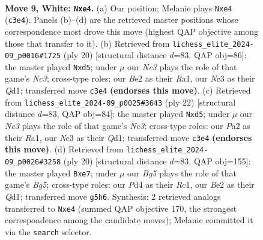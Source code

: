 \documentclass[11pt]{article}
\begin{document}
\clearpage

\begin{figure}[p]\centering
\begin{subfigure}{0.46\textwidth}\centering
\resizebox{\linewidth}{!}{%
\newchessgame
\chessboard[
  setfen={r1bqk2r/pp1nbppp/2p5/3p2B1/3Pn3/2N1P3/PP2BPPP/R2QK1NR w KQkq - 4 9},
  showmover=false,
  pgfstyle=straightmove, color=movearrow, markmove={c3-e4}
]}
\caption{}
\end{subfigure}\hfill
\begin{subfigure}{0.46\textwidth}\centering
\resizebox{\linewidth}{!}{%
\newchessgame
\chessboard[
  setfen={rn1qkb1r/1p3pp1/p3b2p/3np3/6P1/1NN1B3/PPP2P1P/R2QKBR1 w Qkq - 0 11},
  showmover=false,
  pgfstyle=straightmove, color=movearrow, markmove={c3-d5}
]}
\caption{}
\end{subfigure}
\\[4pt]
\begin{subfigure}{0.46\textwidth}\centering
\resizebox{\linewidth}{!}{%
\newchessgame
\chessboard[
  setfen={r2qkb1r/1p3pp1/p1n1b3/3np2p/8/2N1BN1P/PPP2PP1/R2QKB1R w KQkq - 0 12},
  showmover=false,
  pgfstyle=straightmove, color=movearrow, markmove={c3-d5}
]}
\caption{}
\end{subfigure}\hfill
\begin{subfigure}{0.46\textwidth}\centering
\resizebox{\linewidth}{!}{%
\newchessgame
\chessboard[
  setfen={r1bqr1k1/pp1nbppp/2p5/3p2B1/3Pn3/2NBPN2/PP3PPP/2RQ1RK1 w - - 4 11},
  showmover=false,
  pgfstyle=straightmove, color=movearrow, markmove={g5-e7}
]}
\caption{}
\end{subfigure}
\caption{\textbf{Move 9, White: \texttt{Nxe4}.} (a) Our position; Melanie plays \texttt{Nxe4} (\texttt{c3e4}). Panels (b)--(d) are the retrieved master positions whose correspondence most drove this move (highest QAP objective among those that transfer to it). (b) Retrieved from \texttt{lichess\_elite\_2024-09\_p0016\#1725} (ply 20) [structural distance $d$=83, QAP obj=86]: the master played \texttt{Nxd5}; under $\mu$ our \emph{Nc3} plays the role of that game's \emph{Nc3}; cross-type roles: our \emph{B}e2 as their \emph{R}a1, our \emph{N}c3 as their \emph{Q}d1; transferred move \texttt{c3e4} \textbf{(endorses this move)}. (c) Retrieved from \texttt{lichess\_elite\_2024-09\_p0025\#3643} (ply 22) [structural distance $d$=83, QAP obj=84]: the master played \texttt{Nxd5}; under $\mu$ our \emph{Nc3} plays the role of that game's \emph{Nc3}; cross-type roles: our \emph{P}a2 as their \emph{R}a1, our \emph{N}c3 as their \emph{Q}d1; transferred move \texttt{c3e4} \textbf{(endorses this move)}. (d) Retrieved from \texttt{lichess\_elite\_2024-09\_p0026\#3258} (ply 20) [structural distance $d$=83, QAP obj=155]: the master played \texttt{Bxe7}; under $\mu$ our \emph{Bg5} plays the role of that game's \emph{Bg5}; cross-type roles: our \emph{P}d4 as their \emph{R}c1, our \emph{B}e2 as their \emph{Q}d1; transferred move \texttt{g5h6}. Synthesis: 2 retrieved analogs transferred to \texttt{Nxe4} (summed QAP objective 170, the strongest correspondence among the candidate moves); Melanie committed it via the \texttt{search} selector.}
\label{fig:thought-m16}
\end{figure}
\end{document}
